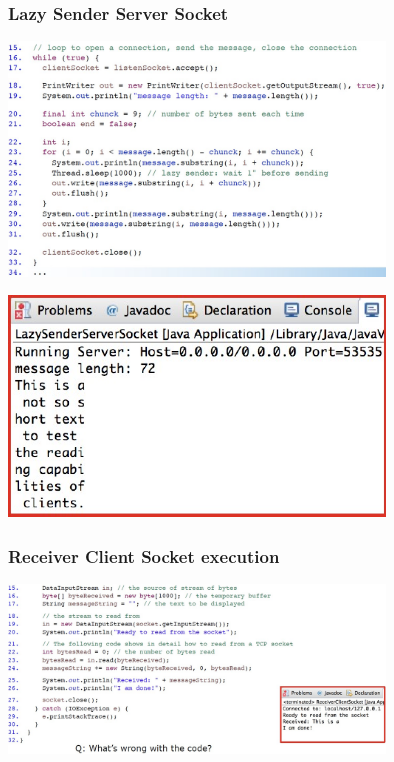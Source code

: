 \subsubsection{Lazy Sender Server Socket}
\begin{center}
    \includegraphics[width=0.75\textwidth]{img/LazySenderServerSocket1.jpg}
\end{center}
\begin{center}
    \includegraphics[width=0.75\textwidth]{img/LazySenderServerSocket2.jpg}
\end{center}

\subsubsection{Receiver Client Socket execution}
\begin{center}
    \includegraphics[width=0.75\textwidth]{img/LazySenderServerSocket3.jpg}
\end{center}

